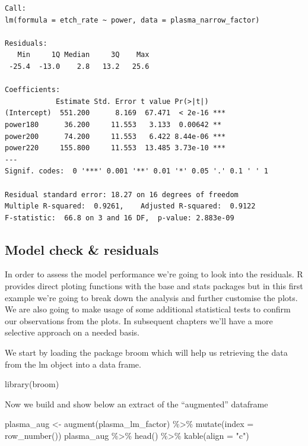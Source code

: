 \documentclass[
]{book}
\newenvironment{Shaded}{\begin{snugshade}}{\end{snugshade}}
\newcommand{\AttributeTok}[1]{\textcolor[rgb]{0.77,0.63,0.00}{#1}}
\newcommand{\FunctionTok}[1]{\textcolor[rgb]{0.00,0.00,0.00}{#1}}
\newcommand{\NormalTok}[1]{#1}
\newcommand{\OtherTok}[1]{\textcolor[rgb]{0.56,0.35,0.01}{#1}}
\newcommand{\SpecialCharTok}[1]{\textcolor[rgb]{0.00,0.00,0.00}{#1}}
\newcommand{\StringTok}[1]{\textcolor[rgb]{0.31,0.60,0.02}{#1}}
\begin{document}
\begin{verbatim}
Call:
lm(formula = etch_rate ~ power, data = plasma_narrow_factor)

Residuals:
   Min     1Q Median     3Q    Max 
 -25.4  -13.0    2.8   13.2   25.6 

Coefficients:
            Estimate Std. Error t value Pr(>|t|)    
(Intercept)  551.200      8.169  67.471  < 2e-16 ***
power180      36.200     11.553   3.133  0.00642 ** 
power200      74.200     11.553   6.422 8.44e-06 ***
power220     155.800     11.553  13.485 3.73e-10 ***
---
Signif. codes:  0 '***' 0.001 '**' 0.01 '*' 0.05 '.' 0.1 ' ' 1

Residual standard error: 18.27 on 16 degrees of freedom
Multiple R-squared:  0.9261,	Adjusted R-squared:  0.9122 
F-statistic:  66.8 on 3 and 16 DF,  p-value: 2.883e-09
\end{verbatim}

\hypertarget{model-check-residuals}{%
\subsection{Model check \& residuals}\label{model-check-residuals}}

In order to assess the model performance we're going to look into the residuals. R provides direct ploting functions with the base and stats packages but in this first example we're going to break down the analysis and further customise the plots. We are also going to make usage of some additional statistical tests to confirm our observations from the plots. In subsequent chapters we'll have a more selective approach on a needed basis.

We start by loading the package broom which will help us retrieving the data from the lm object into a data frame.

\begin{Shaded}
\begin{Highlighting}[]
\FunctionTok{library}\NormalTok{(broom)}
\end{Highlighting}
\end{Shaded}

Now we build and show below an extract of the ``augmented'' dataframe

\begin{Shaded}
\begin{Highlighting}[]
\NormalTok{plasma\_aug }\OtherTok{\textless{}{-}} \FunctionTok{augment}\NormalTok{(plasma\_lm\_factor) }\SpecialCharTok{\%\textgreater{}\%}
  \FunctionTok{mutate}\NormalTok{(}\AttributeTok{index =} \FunctionTok{row\_number}\NormalTok{())}
\NormalTok{plasma\_aug }\SpecialCharTok{\%\textgreater{}\%}
  \FunctionTok{head}\NormalTok{() }\SpecialCharTok{\%\textgreater{}\%}
  \FunctionTok{kable}\NormalTok{(}\AttributeTok{align =} \StringTok{"c"}\NormalTok{)}
\end{Highlighting}
\end{Shaded}
\end{document}
